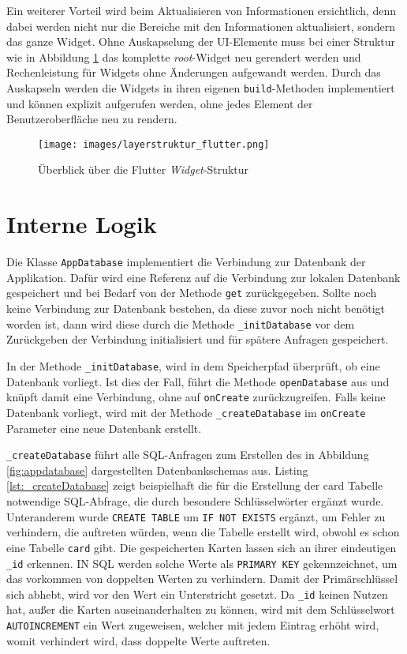 Ein weiterer Vorteil wird beim Aktualisieren von Informationen ersichtlich, denn dabei werden nicht nur die Bereiche mit den Informationen aktualisiert, sondern das ganze Widget. Ohne Auskapselung der UI-Elemente muss bei einer Struktur wie in Abbildung \ref{fig:flutter_structure} das komplette \textit{root}-Widget neu gerendert werden und Rechenleistung für Widgets ohne Änderungen aufgewandt werden. Durch das Auskapseln werden die Widgets in ihren eigenen \texttt{build}-Methoden implementiert und können explizit aufgerufen werden, ohne jedes Element der Benutzeroberfläche neu zu rendern.

\begin{center}
    \begin{figure}
        \centering
        \texttt{[image: images/layerstruktur\_flutter.png]}
        \caption{Überblick über die Flutter \textit{Widget}-Struktur}
        \label{fig:flutter_structure}
    \end{figure}
\end{center}

\section{Interne Logik}
\label{section:interne_logik}
Die Klasse \texttt{AppDatabase} implementiert die Verbindung zur Datenbank der Applikation. Dafür wird eine Referenz auf die Verbindung zur lokalen Datenbank gespeichert und bei Bedarf von der Methode \texttt{get} zurückgegeben. Sollte noch keine Verbindung zur Datenbank bestehen, da diese zuvor noch nicht benötigt worden ist, dann wird diese durch die Methode \texttt{\_initDatabase} vor dem Zurückgeben der Verbindung initialisiert und für spätere Anfragen gespeichert.

In der Methode \texttt{\_initDatabase}, wird in dem Speicherpfad überprüft, ob eine Datenbank vorliegt. Ist dies der Fall, führt die Methode \texttt{openDatabase} aus und knüpft damit eine Verbindung, ohne auf \texttt{onCreate} zurückzugreifen. Falls keine Datenbank vorliegt, wird mit der Methode \texttt{\_createDatabase} im \texttt{onCreate} Parameter eine neue Datenbank erstellt.

\texttt{\_createDatabase} führt alle SQL-Anfragen zum Erstellen des in Abbildung \ref{fig:appdatabase} dargestellten Datenbankschemas aus. Listing \ref{lst:_createDatabase} zeigt beispielhaft die für die Erstellung der card Tabelle notwendige SQL-Abfrage, die durch besondere Schlüsselwörter ergänzt wurde. Unteranderem wurde \texttt{CREATE TABLE} um \texttt{IF NOT EXISTS} ergänzt, um Fehler zu verhindern, die auftreten würden, wenn die Tabelle erstellt wird, obwohl es schon eine Tabelle \texttt{card} gibt. Die gespeicherten Karten lassen sich an ihrer eindeutigen \texttt{\_id} erkennen. IN SQL werden solche Werte als \texttt{PRIMARY KEY} gekennzeichnet, um das vorkommen von doppelten Werten zu verhindern. Damit der Primärschlüssel sich abhebt, wird vor den Wert ein Unterstricht gesetzt. Da \texttt{\_id} keinen Nutzen hat, außer die Karten auseinanderhalten zu können, wird mit dem Schlüsselwort \texttt{AUTOINCREMENT} ein Wert zugeweisen, welcher mit jedem Eintrag erhöht wird, womit verhindert wird, dass doppelte Werte auftreten.


